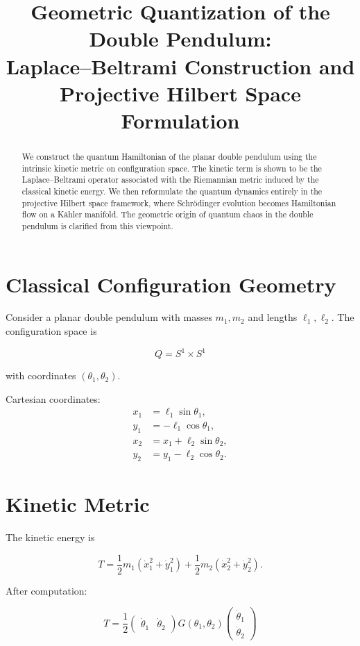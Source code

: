 \documentclass[11pt]{article}
\title{Geometric Quantization of the Double Pendulum:\\
Laplace--Beltrami Construction and Projective Hilbert Space Formulation}
\author{}
\date{}
\begin{document}
\maketitle

\begin{abstract}
We construct the quantum Hamiltonian of the planar double pendulum
using the intrinsic kinetic metric on configuration space.
The kinetic term is shown to be the Laplace--Beltrami operator
associated with the Riemannian metric induced by the classical kinetic energy.
We then reformulate the quantum dynamics entirely in the projective
Hilbert space framework, where Schr\"odinger evolution becomes
Hamiltonian flow on a K\"ahler manifold.
The geometric origin of quantum chaos in the double pendulum
is clarified from this viewpoint.
\end{abstract}

\section{Classical Configuration Geometry}

Consider a planar double pendulum with masses $m_1,m_2$
and lengths $\ell_1,\ell_2$.
The configuration space is

\[
Q = S^1 \times S^1
\]

with coordinates $(\theta_1,\theta_2)$.

Cartesian coordinates:
\begin{align}
x_1 &= \ell_1 \sin\theta_1, \\
y_1 &= -\ell_1 \cos\theta_1, \\
x_2 &= x_1 + \ell_2 \sin\theta_2, \\
y_2 &= y_1 - \ell_2 \cos\theta_2 .
\end{align}

\section{Kinetic Metric}

The kinetic energy is

\[
T = \frac12 m_1(\dot x_1^2+\dot y_1^2)
    +\frac12 m_2(\dot x_2^2+\dot y_2^2).
\]

After computation:

\[
T = \frac12
\begin{pmatrix}
\dot\theta_1 & \dot\theta_2
\end{pmatrix}
G(\theta_1,\theta_2)
\begin{pmatrix}
\dot\theta_1 \\
\dot\theta_2
\end{pmatrix}
\]
\end{document}
